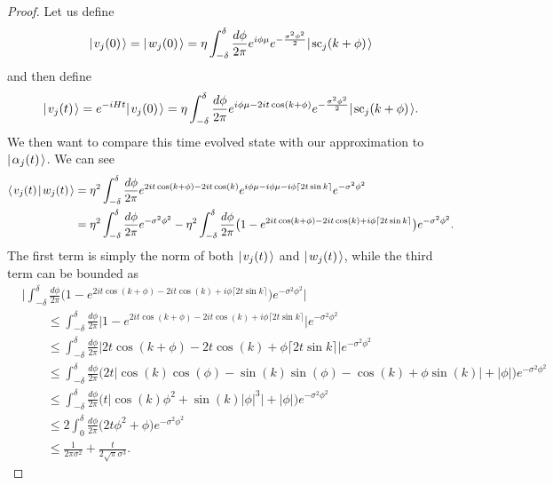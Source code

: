 \documentclass[../thesis-main/thesis-main]{subfiles}
\begin{document}
\begin{proof}
Let us define
\begin{align}
  |\mspace{2mu} v_j(0) \mspace{2mu} \rangle = |\mspace{2mu} w_j(0) \mspace{2mu} \rangle = \eta \int_{-\delta}^\delta \frac{d\phi}{2\pi} e^{ i \phi \mu} e^{ - \frac{\sigma^2 \phi^2}{2}}|\mspace{2mu} \text{sc}_j(k+\phi) \mspace{2mu} \rangle
\end{align}
and then define 
\begin{align}
  |\mspace{2mu} v_j(t) \mspace{2mu} \rangle = e^{-i H t} |\mspace{2mu} v_j(0) \mspace{2mu} \rangle = \eta \int_{-\delta}^\delta \frac{d\phi}{2\pi} e^{ i \phi \mu - 2 i t \cos(k+\phi)} e^{ - \frac{\sigma^2 \phi^2}{2}} |\mspace{2mu} \text{sc}_j(k+\phi) \mspace{2mu} \rangle.
\end{align}
We then want to compare this time evolved state with our approximation to $|\mspace{2mu} \alpha_j(t) \mspace{2mu} \rangle$.  We can see 
\begin{align}
  \langle\mspace{2mu} v_j(t) \mspace{2mu} | \mspace{2mu} w_j(t)\mspace{2mu} \rangle &= \eta^2 \int_{-\delta}^\delta \frac{d\phi}{2\pi} e^{ 2i t \cos(k+\phi) - 2 i t \cos(k)} e^{ i \phi \mu - i \phi \mu - i \phi \lceil 2t \sin k\rceil} e^{-\sigma^2 \phi^2}\\
  &= \eta^2 \int_{-\delta}^\delta \frac{d\phi}{2\pi} e^{-\sigma^2\phi^2} - \eta^2 \int_{-\delta}^\delta \frac{d\phi}{2\pi}\big( 1 - e^{ 2i t \cos(k+\phi) - 2 i t \cos(k) +i \phi \lceil 2t \sin k\rceil} \big)e^{-\sigma^2\phi^2}.
\end{align}
The first term is simply the norm of both $|\mspace{2mu} v_j(t) \mspace{2mu} \rangle$ and $|\mspace{2mu} w_j(t) \mspace{2mu} \rangle$, while the third term can be bounded as
\begin{align}
 & \Bigg| \int_{-\delta}^\delta \frac{d\phi}{2\pi}\big( 1 - e^{ 2i t \cos(k+\phi) - 2 i t \cos(k) + i \phi \lceil 2t \sin k\rceil} \big)e^{-\sigma^2\phi^2}\Bigg| \\
 &\qquad\leq \int_{-\delta}^\delta \frac{d\phi}{2\pi}\big| 1 - e^{ 2i t \cos(k+\phi) - 2 i t \cos(k) + i \phi \lceil 2t \sin k\rceil} \big|e^{-\sigma^2\phi^2}\\
  &\qquad\leq \int_{-\delta}^\delta \frac{d\phi}{2\pi}\big|2 t \cos(k+\phi) - 2 t \cos(k) + \phi \lceil 2t \sin k\rceil \big|e^{-\sigma^2\phi^2}\\
  &\qquad\leq \int_{-\delta}^\delta \frac{d\phi}{2\pi} \Big(2t \big|\cos(k) \cos(\phi) - \sin(k)\sin(\phi) - \cos(k) + \phi\sin(k)\big|+|\phi|\Big)e^{-\sigma^2\phi^2}\\
  &\qquad\leq \int_{-\delta}^\delta \frac{d\phi}{2\pi} \Big( t \big| \cos(k) \phi^2 + \sin(k) |\phi|^3\big| + |\phi|\Big) e^{-\sigma^2\phi^2}\\
  &\qquad \leq 2 \int_{0}^\delta \frac{d \phi}{2\pi} \big( 2 t \phi^2 + \phi\big) e^{-\sigma^2\phi^2}\\
  & \qquad \leq \frac{1}{2\pi\sigma^2} + \frac{t}{2\sqrt{\pi} \sigma^3}.

\end{align}
\end{proof}
\end{document}
